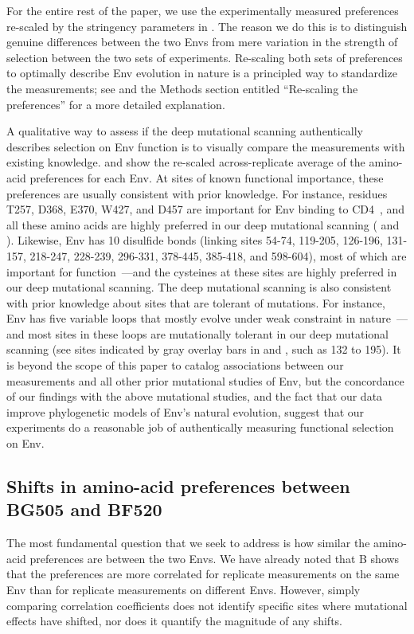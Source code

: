 \documentclass[9pt]{elife}
\begin{document}
For the entire rest of the paper, we use the experimentally measured preferences re-scaled by the stringency parameters in .
The reason we do this is to distinguish genuine differences between the two Envs from mere variation in the strength of selection between the two sets of experiments.
Re-scaling both sets of preferences to optimally describe Env evolution in nature is a principled way to standardize the measurements; see \citet{hilton2017phydms} and the Methods section entitled ``Re-scaling the preferences'' for a more detailed explanation.

A qualitative way to assess if the deep mutational scanning authentically describes selection on Env function is to visually compare the measurements with existing knowledge.
 and  show the re-scaled across-replicate average of the amino-acid preferences for each Env.
At sites of known functional importance, these preferences are usually consistent with prior knowledge.
For instance, residues T257, D368, E370, W427, and D457 are important for Env binding to CD4~\citep{olshevsky1990identification}, and all these amino acids are highly preferred in our deep mutational scanning ( and ).
Likewise, Env has 10 disulfide bonds (linking sites 54-74, 119-205, 126-196, 131-157, 218-247, 228-239, 296-331, 378-445, 385-418, and 598-604), most of which are important for function~\citep{van2008only}---and the cysteines at these sites are highly preferred in our deep mutational scanning.
The deep mutational scanning is also consistent with prior knowledge about sites that are tolerant of mutations.
For instance, Env has five variable loops that mostly evolve under weak constraint in nature~\citep{starcich1986identification,zolla2010structure}---and most sites in these loops are mutationally tolerant in our deep mutational scanning (see sites indicated by gray overlay bars in  and , such as 132 to 195).
It is beyond the scope of this paper to catalog associations between our measurements and all other prior mutational studies of Env, but the concordance of our findings with the above mutational studies, and the fact that our data improve phylogenetic models of Env's natural evolution, suggest that our experiments do a reasonable job of authentically measuring functional selection on Env.

\subsection{Shifts in amino-acid preferences between BG505 and BF520}
The most fundamental question that we seek to address is how similar the amino-acid preferences are between the two Envs.
We have already noted that B shows that the preferences are more correlated for replicate measurements on the same Env than for replicate measurements on different Envs.
However, simply comparing correlation coefficients does not identify specific sites where mutational effects have shifted, nor does it quantify the magnitude of any shifts.
\end{document}
